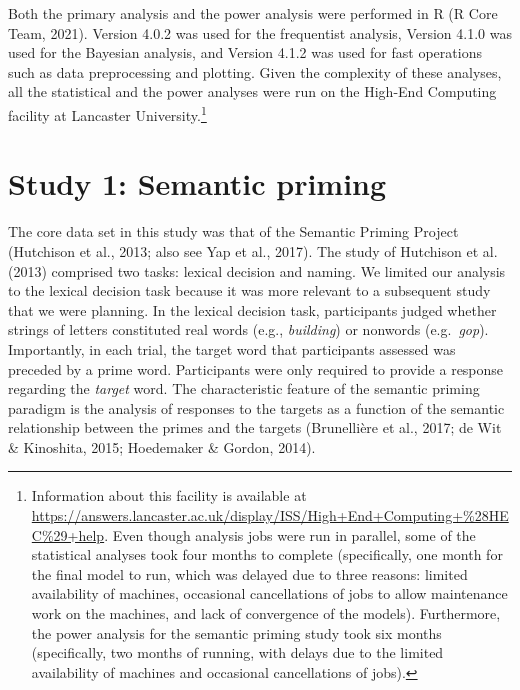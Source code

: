 \documentclass[
  12pt,
  man,floatsintext]{apa7}
\begin{document}
Both the primary analysis and the power analysis were performed in R (R Core Team, 2021). Version 4.0.2 was used for the frequentist analysis, Version 4.1.0 was used for the Bayesian analysis, and Version 4.1.2 was used for fast operations such as data preprocessing and plotting. Given the complexity of these analyses, all the statistical and the power analyses were run on the High-End Computing facility at Lancaster University.\footnote{Information about this facility is available at \url{https://answers.lancaster.ac.uk/display/ISS/High+End+Computing+\%28HEC\%29+help}. Even though analysis jobs were run in parallel, some of the statistical analyses took four months to complete (specifically, one month for the final model to run, which was delayed due to three reasons: limited availability of machines, occasional cancellations of jobs to allow maintenance work on the machines, and lack of convergence of the models). Furthermore, the power analysis for the semantic priming study took six months (specifically, two months of running, with delays due to the limited availability of machines and occasional cancellations of jobs).}

\hypertarget{study-1-semantic-priming}{%
\section{Study 1: Semantic priming}\label{study-1-semantic-priming}}

The core data set in this study was that of the Semantic Priming Project (Hutchison et al., 2013; also see Yap et al., 2017). The study of Hutchison et al. (2013) comprised two tasks: lexical decision and naming. We limited our analysis to the lexical decision task because it was more relevant to a subsequent study that we were planning. In the lexical decision task, participants judged whether strings of letters constituted real words (e.g., \emph{building}) or nonwords (e.g.~\emph{gop}). Importantly, in each trial, the target word that participants assessed was preceded by a prime word. Participants were only required to provide a response regarding the \emph{target} word. The characteristic feature of the semantic priming paradigm is the analysis of responses to the targets as a function of the semantic relationship between the primes and the targets (Brunellière et al., 2017; de Wit \& Kinoshita, 2015; Hoedemaker \& Gordon, 2014).
\end{document}
